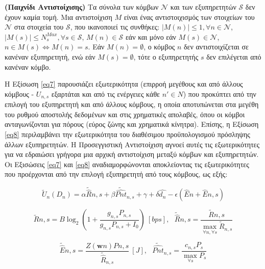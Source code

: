 \begin{definition} \label{Definition 1} \textbf{(Παιχνίδι Αντιστοίχισης)} Τα σύνολα των κόμβων $\mathcal{N}$ και των εξυπηρετητών $\mathcal{S}$ δεν έχουν καμία τομή. Μια αντιστοίχιση $M$ είναι ένας αντιστοιχισμός των στοιχείων του $\mathcal{N}$ στα στοιχεία του $\mathcal{S}$, που ικανοποιεί τις συνθήκες: $|M(n)| \leq 1, \forall n \in \mathcal{N}$, $|M(s)| \leq N_s^{Max}, \forall s \in \mathcal{S}$, $M(n) \in \mathcal{S}$ εάν και μόνο εάν $M(s) \in \mathcal{N}$, $n \in M(s) \Leftrightarrow M(n) = s$. Εάν $M(n) = \emptyset$, ο κόμβος $n$ δεν αντιστοιχίζεται σε κανέναν εξυπηρετητή, ενώ εάν $M(s) = \emptyset$, τότε ο εξυπηρετητής $s$ δεν επιλέγεται από κανέναν κόμβο.

\end{definition}

Η Εξίσωση \ref{eq7} παρουσιάζει εξωτερικότητα (επιρροή μεγέθους και από άλλους κόμβους - $U_{n,s}$ εξαρτάται και από τις ενέργειες κάθε $n' \in N$) που προκύπτει από την επιλογή του εξυπηρετητή και από άλλους κόμβους, η οποία αποτυπώνεται στα μεγέθη του ρυθμού αποστολής δεδομένων και στις χρηματικές απολαβές, όπου οι κόμβοι ανταγωνίζονται για πόρους (εύρος ζώνης και χρηματικά κίνητρα). Επίσης, η Εξίσωση \ref{eq8} περιλαμβάνει την εξωτερικότητα του διαθέσιμου προϋπολογισμού πρόσληψης άλλων εξυπηρετητών. Η Προσεγγιστική Αντιστοίχιση αγνοεί αυτές τις εξωτερικότητες για να εδραιώσει γρήγορα μια αρχική αντιστοίχιση μεταξύ κόμβων και εξυπηρετητών. Οι Εξισώσεις \ref{eq7} και \ref{eq8} αναδιαμορφώνονται αποκλείοντας τις εξωτερικότητες που προέρχονται από την επιλογή εξυπηρετητή από τους κόμβους, ως εξής:

\vspace{-8pt}

\begin{equation}
\widetilde{U}_n(D_n)=\alpha \widetilde{\hat{R}}{n,s} + \beta \widetilde{\hat{Pnt}}_{n,s} +\gamma + \delta \hat{d_n} -\epsilon (\hat{E}n+\hat{E}{n,s})
\label{eq9}
\end{equation}

\vspace{-8pt}

\[\widetilde{R}{n,s} = B \log_2(1 + \frac{g_{n,s} P_{n,s}}{g_{n,s} P_{n,s} + I_0}) \> [bps], \>\>\> \widetilde{\hat{R}}{n,s} = \frac{\widetilde{R}{n,s}}{\max \limits_{\forall n, \forall s} { \widetilde{R}_{n,s} }}\]

\[\widetilde{\hat{E}}{n,s} = \frac{Z(\mathbf{w}n)P{n,s}}{\widetilde{\hat{R}}_{n,s}} \> [J], \>\>\> \widetilde{\hat{Pnt}}_{n,s} = \frac{c_{n,s}P_s}{\max \limits_{\forall s} P_s}\]

